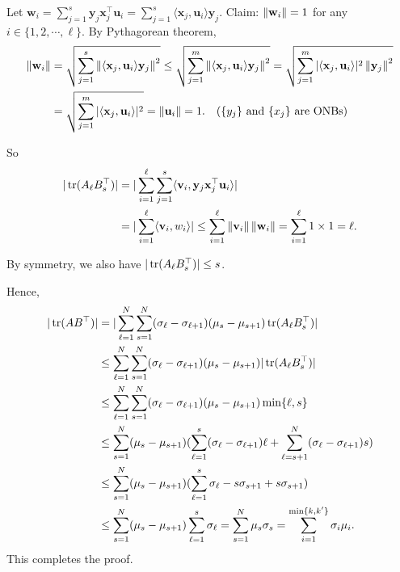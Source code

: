 \begin{pfbox}
Let $\mathbf{w}_i=\displaystyle\sum_{j=1}^{s}\mathbf{y}_j\mathbf{x}_j^\top \mathbf{u}_i=\displaystyle\sum_{j=1}^{s}\langle \mathbf{x}_j, \mathbf{u}_i\rangle \mathbf{y}_j.$
Claim: $\left\lVert \mathbf{w}_i \right\rVert = 1$ for any $i\in\{1,2,\cdots,\ell\}.$
By Pythagorean theorem,
\begin{align*}
\left\lVert \mathbf{w}_i \right\rVert&=\sqrt{\sum_{j=1}^{s}\left\lVert \langle \mathbf{x}_j, \mathbf{u}_i\rangle \mathbf{y}_j \right\rVert^2}
\le\sqrt{\sum_{j=1}^{m}\left\lVert \langle \mathbf{x}_j, \mathbf{u}_i\rangle \mathbf{y}_j \right\rVert^2}
=\sqrt{\sum_{j=1}^{m}|\langle \mathbf{x}_j, \mathbf{u}_i\rangle |^2\left\lVert \mathbf{y}_j \right\rVert^2}\\
&=\sqrt{\sum_{j=1}^{m}|\langle \mathbf{x}_j, \mathbf{u}_i\rangle |^2} 
=\left\lVert \mathbf{u}_i \right\rVert=1.  \quad \text{($\{y_j\}$ and $\{x_j\}$ are ONBs)}
\end{align*}

So
\begin{align*}
|\operatorname{tr}(A_\ell B_s^\top)|& = |\sum_{i=1}^{\ell}\sum_{j=1}^{s} \langle \mathbf{v}_i, \mathbf{y}_j\mathbf{x}_j^\top \mathbf{u}_i\rangle|\\
& = |\sum_{i=1}^{\ell}\langle \mathbf{v}_i, w_i\rangle|\le \sum_{i=1}^{\ell}\left\lVert \mathbf{v}_i \right\rVert\left\lVert \mathbf{w}_i \right\rVert=\sum_{i=1}^{\ell}1\times 1 = \ell.    
\end{align*}

By symmetry, we also have $|\operatorname{tr}(A_\ell B_s^\top)|\le s$.

Hence,
\begin{align*}
|\operatorname{tr}(AB^\top)|&=|\sum_{\ell=1}^{N}\sum_{s=1}^{N}(\sigma_\ell-\sigma_{\ell+1})(\mu_s-\mu_{s+1})\operatorname{tr}(A_\ell B_s^\top)|\\
&\le \sum_{\ell=1}^{N}\sum_{s=1}^{N}(\sigma_\ell-\sigma_{\ell+1})(\mu_s-\mu_{s+1})|\operatorname{tr}(A_\ell B^\top_s)|\\
&\le\sum_{\ell=1}^{N}\sum_{s=1}^{N}(\sigma_\ell-\sigma_{\ell+1})(\mu_s-\mu_{s+1})\min\{\ell,s\}\\
&\le \sum_{s=1}^{N}(\mu_s-\mu_{s+1})(\sum_{\ell=1}^{s}(\sigma_\ell-\sigma_{\ell+1})\ell + \sum_{\ell=s+1}^{N}(\sigma_\ell-\sigma_{\ell+1})s)\\
&\le \sum_{s=1}^{N}(\mu_s-\mu_{s+1})(\sum_{\ell=1}^{s}\sigma_\ell - s\sigma_{s+1} + s\sigma_{s+1})\\
&\le \sum_{s=1}^{N}(\mu_s-\mu_{s+1})\sum_{\ell=1}^{s}\sigma_\ell = \sum_{s=1}^{N}\mu_s\sigma_s = \sum_{i=1}^{\min\{k,k'\}}\sigma_i\mu_i.
\end{align*}
This completes the proof.
\end{pfbox}



